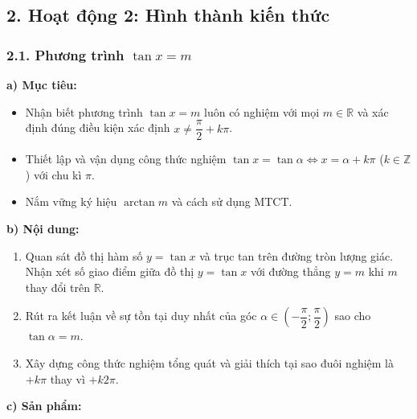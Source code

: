 \documentclass[12pt, a4paper]{article}
\begin{document}
\subsection*{2. Hoạt động 2: Hình thành kiến thức}  
  
\subsubsection*{2.1. Phương trình $\tan x = m$}  
  
\noindent \textbf{a) Mục tiêu:}  
\begin{itemize}[leftmargin=0.8cm]  
    \item Nhận biết phương trình $\tan x = m$ luôn có nghiệm với mọi $m \in \mathbb{R}$ và xác định đúng điều kiện xác định $x \neq \dfrac{\pi}{2} + k\pi$.  
    \item Thiết lập và vận dụng công thức nghiệm $\tan x = \tan\alpha \iff x = \alpha + k\pi$ ($k \in \mathbb{Z}$) với chu kì $\pi$.  
    \item Nắm vững ký hiệu $\arctan m$ và cách sử dụng MTCT.  
\end{itemize}  
  
\noindent \textbf{b) Nội dung:}  
\begin{enumerate}[leftmargin=0.6cm]  
    \item Quan sát đồ thị hàm số $y = \tan x$ và trục tan trên đường tròn lượng giác. Nhận xét số giao điểm giữa đồ thị $y = \tan x$ với đường thẳng $y = m$ khi $m$ thay đổi trên $\mathbb{R}$.  
    \item Rút ra kết luận về sự tồn tại duy nhất của góc $\alpha \in \left(-\dfrac{\pi}{2}; \dfrac{\pi}{2}\right)$ sao cho $\tan\alpha = m$.  
    \item Xây dựng công thức nghiệm tổng quát và giải thích tại sao đuôi nghiệm là $+ k\pi$ thay vì $+ k2\pi$.  
\end{enumerate}  
  
\noindent \textbf{c) Sản phẩm:}  
  
\end{document}

